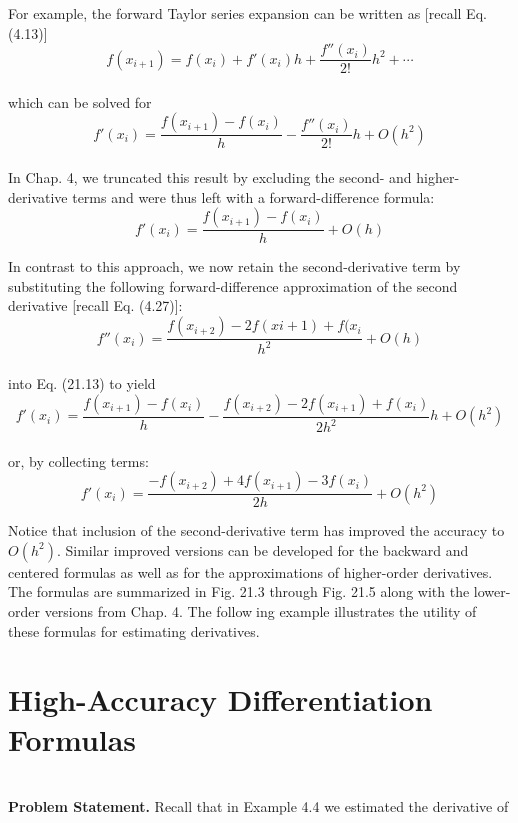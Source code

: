 For example, the forward Taylor series expansion can be written as [recall Eq. (4.13)]
\begin{equation}
	\tag{21.12}
	f(x_{i+1}) = f(x_{i}) + f'(x_{i})h + \dfrac{f''(x_{i})}{2!}h^{2} + \cdots
\end{equation}\\
which can be solved for
\begin{equation}
	\tag{21.13}
	f'(x_{i})= \dfrac{f(x_{i+1})-f(x_{i})}{h} - \dfrac{f''(x_{i})}{2!}h + O(h^{2})
\end{equation}\\
In Chap. 4, we truncated this result by excluding the second- and higher-derivative terms
and were thus left with a forward-difference formula:
\begin{equation}
	\tag{21.14}
	f'(x_{i}) = \dfrac{f(x_{i+1})-f(x_{i})}{h} + O(h)
\end{equation}

In contrast to this approach, we now retain the second-derivative term by substituting
the following forward-difference approximation of the second derivative [recall Eq. (4.27)]:
\begin{equation}
	\tag{21.15}
	f''(x_{i})=\dfrac{f(x_{i+2})-2f(x{i+1}) + f(x_{i}}{h^{2}} + O(h)
\end{equation}\\
into Eq. (21.13) to yield
\begin{equation}
	\tag{21.16}
	f'(x_{i})=\dfrac{f(x_{i+1})-f(x_{i})}{h}-\dfrac{ f(x_{i+2}) -2f(x_{i+1})  + f(x_{i})  }{ 2h^{2} } h + O(h^{2})
\end{equation}\\
or, by collecting terms:
\begin{equation}
	\tag{21.17}
	f'(x_{i}) = \dfrac{ -f(x_{i+2}) +4f(x_{i+1}) -3f(x_{i}) }{ 2h } + O(h^{2})
\end{equation}

Notice that inclusion of the second-derivative term has improved the accuracy to $O(h^{2})$.
Similar improved versions can be developed for the backward and centered formulas as
well as for the approximations of higher-order derivatives. The formulas are summarized in
Fig. 21.3 through Fig. 21.5 along with the lower-order versions from Chap. 4. The following example illustrates the utility of these formulas for estimating derivatives. 

\vspace{0,6in}
\chapter{High-Accuracy Differentiation Formulas}
\vspace{0,1in}
\hline\\
\vspace{0,1in}
\textbf{Problem Statement.} Recall that in Example 4.4 we estimated the derivative of

